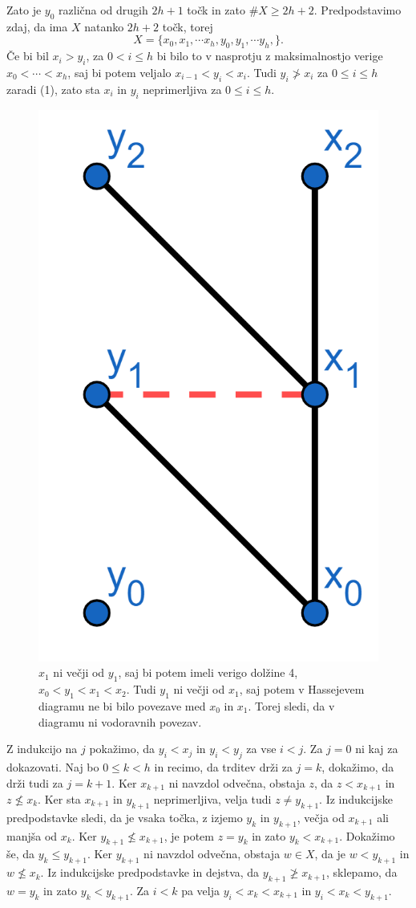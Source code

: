 \documentclass[mat1]{fmfdelo}
\begin{document}
\begin{dokaz}
          Zato je $y_0$ različna od drugih $2h+1$ točk in zato $\# X\geq 2h+2$.
          Predpodstavimo zdaj, da ima $X$ natanko $2h+2$ točk, torej 
          $$
          X=\{x_0,x_1,\cdots x_h,y_0,y_1,\cdots y_h,\}.
          $$
          Če bi bil $x_i > y_i$, za $0<i\leq h$ bi bilo to v nasprotju z 
          maksimalnostjo verige $x_0 <\cdots <x_h$, saj bi potem veljalo $x_{i-1} 
          < y_i < x_i$. Tudi $y_i \ngtr x_i$ za $0\leq i \leq h$ zaradi (1), zato sta $x_i $ in $y_i$ neprimerljiva za $0\leq i \leq h$.
  

          \begin{figure}[h!]
            \centering
            \includegraphics[width=0.2\linewidth]{minsfera_vodoravna.png}
          \caption{$x_1$ ni večji od $y_1$, saj bi potem imeli verigo dolžine 4, $x_0<y_1<x_1<x_2$. Tudi $y_1$ ni večji od $x_1$, saj potem v Hassejevem diagramu ne bi bilo povezave med $x_0$ in $x_1$. Torej sledi, da v diagramu ni vodoravnih povezav.}
          \end{figure}

          Z indukcijo na $j$ pokažimo, da $y_i < x_j$ in $y_i < y_j$ za vse $i<j$. Za $j=0$ 
          ni kaj za dokazovati. Naj bo $0\leq k <h$ in recimo, da trditev drži za $j=k$, 
          dokažimo, da drži tudi za $j=k+1$. Ker $x_{k+1}$ ni navzdol odvečna, 
          obstaja $z$, da $z< x_{k+1}$ in $z\nleq x_k$. Ker sta $x_{k+1}$ in 
          $y_{k+1}$ neprimerljiva, velja tudi $z\neq y_{k+1}$. Iz indukcijske 
          predpodstavke sledi, da je vsaka točka, z izjemo $y_k$ in $y_{k+1}$, večja 
          od $x_{k+1}$ ali manjša od $x_k$. Ker $y_{k+1} \nleq x_{k+1}$, je potem
          $z=y_k$ in zato $y_k<x_{k+1}$. Dokažimo še, da $y_k\leq y_{k+1}$. Ker 
          $y_{k+1}$ ni navzdol odvečna, obstaja $w\in X$, da je $w<y_{k+1}$ in 
          $w\nleq x_k$. Iz indukcijske predpodstavke
           in dejstva, da $y_{k+1}\ngeq x_{k+1}$, sklepamo,
          da $w=y_k$ in zato $y_k<y_{k+1}$. Za $i<k$ pa velja $y_i<x_k<x_{k+1}$ in
          $y_i<x_k<y_{k+1}$.



\end{dokaz}
\end{document}
